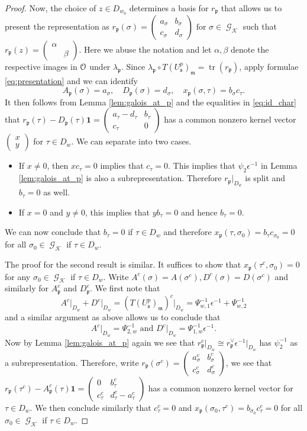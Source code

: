 \documentclass[leqno]{amsart}
\theoremstyle{definition}
\theoremstyle{remark}
\newcommand{\smat}[1]{\left(\begin{smallmatrix} #1 \end{smallmatrix}\right)}
\newcommand{\id}{\mathbf{1}}
\newcommand{\eo}{\EuScript{O}}
\DeclareMathOperator{\mtr}{tr}
\DeclareMathOperator{\Gal}{\mathcal{G}}
\newcommand{\fm}{\mathfrak{m}}
\newcommand{\fp}{\mathfrak{p}}
\newcommand{\fs}{\mathfrak{s}}
\newcommand{\K}{{\mathcal{K}}} %
\begin{document}
\begin{proof}
Now, the choice of $z\in D_{w_0}$
determines a basis for $r_\fp$
that allows us to present the representation as
$r_\fp(\sigma)=\smat{a_\sigma & b_\sigma\\ c_\sigma & d_\sigma} 
\text{ for }\sigma\in\Gal_\K$
such that $r_\fp(z)=\smat{\alpha&\\&\beta}$.
Here we abuse the notation and 
let $\alpha,\beta$ denote the respective images in $\eo$
under $\lambda_\fp$.
Since $\lambda_\fp\circ T(U^p_\fs)_\fm=\mtr(r_\fp)$,
apply formulae \eqref{eq:presentation} and
we can identify
\[
A_{\fp}(\sigma)=a_\sigma,\quad
D_{\fp}(\sigma)=d_\sigma,\quad 
x_{\fp}(\sigma,\tau)=b_\sigma c_\tau.
\]
It then follows from Lemma \ref{lem:galois_at_p}
and the equalities in \eqref{eq:id_char} that 
$r_\fp(\tau)-D_{\fp}(\tau)\id=\smat{a_\tau-d_\tau&b_\tau\\c_\tau& 0}$
has a common nonzero kernel vector $\smat{x\\y}$
for $\tau\in D_w$.
We can separate into two cases.
\begin{itemize}
    \item If $x\neq 0$, then $xc_\tau=0$ implies that $c_\tau=0$.
    This implies that $\psi_2\epsilon^{-1}$
    in Lemma \ref{lem:galois_at_p}
    is also a subrepresentation.
    Therefore $r_\fp\vert_{D_w}$ is split and $b_\tau=0$ as well.
    \item If $x=0$ and $y\neq 0$, this implies that
    $yb_\tau=0$ and hence $b_\tau=0$.
\end{itemize}
We can now conclude that 
$b_\tau=0$ if $\tau\in D_w$
and therefore $x_\fp(\tau,\sigma_0)=b_\tau c_{\sigma_0}=0$
for all $\sigma_0\in\Gal_\K$ if $\tau\in D_w$.

The proof for the second result is similar.
It suffices to show that 
$x_\fp(\tau^c,\sigma_0)=0$
for any $\sigma_0\in\Gal_\K$
if $\tau\in D_w$.
Write 
$A^c(\sigma)=A(\sigma^c),D^c(\sigma)=D(\sigma^c)$
and similarly for $A_\fp^c$ and $D_\fp^c$.
We first note that 
\[
A^c\vert_{D_w}+D^c\vert_{D_w}=(T(U^p_\fs)_\fm)^c\vert_{D_w}
=\Psi_{w,1}^{-1}\epsilon^{-1}+\Psi_{w,2}^{-1}
\]
and a similar argument as above allows us to conclude that
\begin{equation}\label{eq:id_char'}
    A^c\vert_{D_w}=\Psi_{2,w}^{-1} \text{ and }
    D^c\vert_{D_w}=\Psi_{1,w}^{-1}\epsilon^{-1}.
\end{equation}
Now by Lemma \ref{lem:galois_at_p} again
we see that $r_\fp^c\vert_{D_w}\cong r_\fp^\vee\epsilon^{-1}\vert_{D_w}$
has $\psi_2^{-1}$ as a subrepresentation.
Therefore,  write 
$r_\fp(\sigma^c)=\smat{a^c_\sigma & b^c_\sigma\\ c^c_\sigma & d^c_\sigma}$,
we see that
$r_\fp(\tau^c)-A^c_\fp(\tau)\id=
\smat{0& b_\tau^c\\ c_\tau^c & d_\tau^c-a_\tau^c}$
has a common nonzero kernel vector for $\tau\in D_w$.
We then conclude similarly that
$c_\tau^c=0$ and 
$x_\fp(\sigma_0,\tau^c)=b_{\sigma_0}c_\tau^c=0$
for all $\sigma_0\in\Gal_\K$ if $\tau\in D_w$.

\end{proof}
\end{document}
